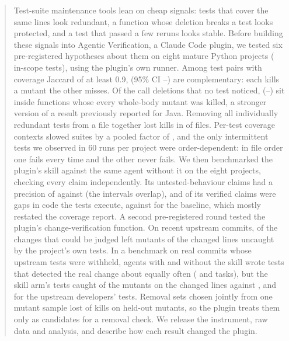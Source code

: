\begin{abstract}
Test-suite maintenance tools lean on cheap signals: tests that cover the same lines look redundant, a function whose deletion breaks a test looks protected, and a test that passed a few reruns looks stable. Before building these signals into Agentic Verification, a Claude Code plugin, we tested six pre-registered hypotheses about them on eight mature Python projects (\NTestsInScope{} in-scope tests), using the plugin's own runner. Among test pairs with coverage Jaccard of at least 0.9, \HOneShare{} (95\% CI \HOneLo{}--\HOneHi{}) are complementary: each kills a mutant the other misses. Of the call deletions that no test noticed, \HThreeShare{} (\HThreeLo{}--\HThreeHi{}) sit inside functions whose every whole-body mutant was killed, a stronger version of a result previously reported for Java. Removing all individually redundant tests from a file together lost kills in \HFourLosing{} of \HFourEligible{} files. Per-test coverage contexts slowed suites by a pooled factor of \HFiveRatio{}, and the only intermittent tests we observed in 60 runs per project were order-dependent: in file order one fails every time and the other never fails. \HTwoAbstract{} We then benchmarked the plugin's skill against the same agent without it on the eight projects, checking every claim independently. Its untested-behaviour claims had a precision of \BenchSkillPrecision{} against \BenchBasePrecision{} (the intervals overlap), and \BenchSkillVerifiedMutant{} of its verified claims were gaps in code the tests execute, against \BenchBaseVerifiedMutant{} for the baseline, which mostly restated the coverage report. A second pre-registered round tested the plugin's change-verification function. On recent upstream commits, \HSevenGapShare{} of the changes that could be judged left mutants of the changed lines uncaught by the project's own tests. In a benchmark on \VTasks{} real commits whose upstream tests were withheld, agents with and without the skill wrote tests that detected the real change about equally often (\VOneSkill{} and \VOneBase{} tasks), but the skill arm's tests caught \VTwoSkillRate{} of the mutants on the changed lines against \VTwoBaseRate{}, and \VTwoUpRate{} for the upstream developers' tests. Removal sets chosen jointly from one mutant sample lost \HEightLostShare{} of kills on held-out mutants, so the plugin treats them only as candidates for a removal check. We release the instrument, raw data and analysis, and describe how each result changed the plugin.
\end{abstract}
